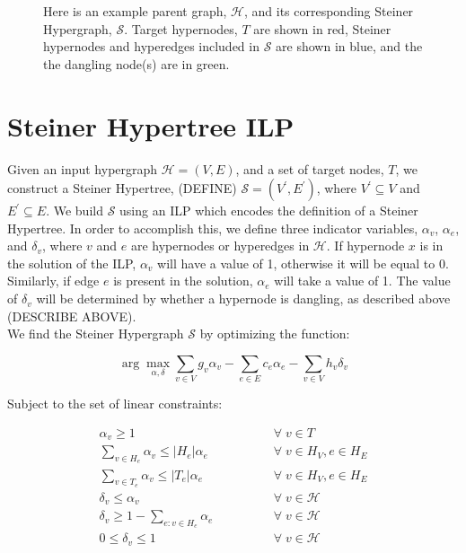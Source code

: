 \documentclass[12pt,twoside]{reedthesis}
\newcommand{\argmax}{\arg\!\max}
\begin{document}
	\begin{figure}[h]
		  \centering
		\caption{Here is an example parent graph, $\mathcal{H}$, and its corresponding Steiner Hypergraph, $\mathcal{S}$.  Target hypernodes, $T$ are shown in red, Steiner hypernodes and hyperedges included in $\mathcal{S}$ are shown in blue, and the the dangling node(s) are in green.}
		\label{fig:shypertree}
	\end{figure}

\section{Steiner Hypertree ILP}

Given an input hypergraph $\mathcal{H}=(V,E)$, and a set of target nodes, $T$, we construct a Steiner Hypertree, (DEFINE) $\mathcal{S}= (V^\prime,E^\prime)$, where $V^\prime \subseteq V$ and $E^\prime \subseteq E$.  We build $\mathcal{S}$ using an ILP which encodes the definition of a Steiner Hypertree.  In order to accomplish this, we define three indicator variables, $\alpha_v$, $\alpha_e$, and $\delta_v$, where $v$ and $e$ are hypernodes or hyperedges in $\mathcal{H}$.  If hypernode $x$ is in the solution of the ILP, $\alpha_v$ will have a value of 1, otherwise it will be equal to 0.  Similarly, if edge $e$ is present in the solution, $\alpha_e$ will take a value of 1. The value of $\delta_v$ will be determined by whether a hypernode is dangling, as described above (DESCRIBE ABOVE).\\

We find the Steiner Hypergraph $\mathcal{S}$ by optimizing the function:

\begin{equation} \label{eq:ilpsum}
 \argmax_{\alpha , \delta} \sum_{v \in V} g_v \alpha_v - \sum_{e \in E} c_e \alpha_e - \sum_{v \in V} h_v \delta_v
\end{equation}

Subject to the set of linear constraints:

\begin{align}
        \alpha_v \geq 1 \qquad\qquad &\forall\; v \in T\label{eq:ilpT}\\
        \sum_{v \in H_e} \alpha_v \leq \lvert H_e\rvert \alpha_e \qquad\qquad &\forall\; v \in H_V , e \in H_E\label{eq:ilpinchead}\\
        \sum_{v \in T_e} \alpha_v \leq \lvert T_e\rvert \alpha_e\qquad\qquad &\forall\; v \in H_V , e \in H_E\label{eq:ilpinctail}\\
        \delta_v \leq \alpha_v \qquad\qquad &\forall\; v \in \mathcal{H}\label{eq:ilpdang1}\\
        \delta_v \geq 1 - \sum_{e:v \in H_e} \alpha_e \qquad\qquad &\forall\; v \in \mathcal{H}\label{eq:ilpdang2}\\
        0 \leq \delta_v \leq 1 \qquad\qquad &\forall\; v \in \mathcal{H}\label{eq:ilpdang3}%
\end{align}%
\end{document}
